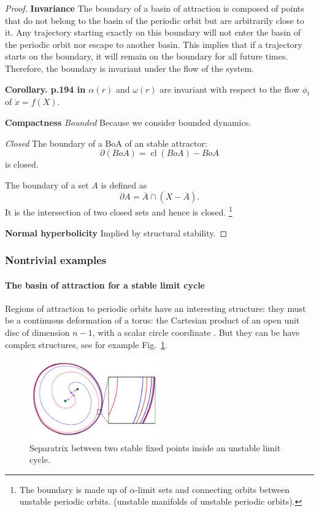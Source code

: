 \documentclass{article}
\theoremstyle{definition} \newtheorem{definition}{Definition}
\theoremstyle{remark} \newtheorem{remark}{Remark}
\newcommand{\cl}{\operatorname{cl}}
\newcounter{ct}
\begin{document}
\begin{proof}
\textbf{Invariance}
The boundary of a basin of attraction is composed of points that do not belong to the basin of the periodic orbit but are arbitrarily close to it.
 Any trajectory starting exactly on this boundary will not enter the basin of the periodic orbit nor escape to another basin.
This implies that if a trajectory starts on the boundary, it will remain on the boundary for all future times. Therefore, the boundary is invariant under the flow of the system.


\textbf{Corollary. p.194 in \citep{perko2013differential}} \( \alpha(r) \) and \( \omega(r) \) are invariant with respect to the flow \( \phi_t \) of \(\dot x = f(X)\). %

\textbf{Compactness}
\textit{Bounded} Because we consider bounded dynamics.

\textit{Closed} 
The boundary of a BoA of an stable attractor:
\[\partial(BoA) = \cl(BoA) -  BoA\]
is closed.

The boundary of a set \( A \) is defined as 
\[
\partial A = \overline{A} \cap (X - \overline{A}).
\]
It is the intersection of two closed sets and hence is closed.
\footnote{
The boundary is made up of 
$\alpha$-limit sets 
and
connecting orbits between unstable periodic orbits.
(unstable manifolds of unstable periodic orbits).
}


\textbf{Normal hyperbolicity}
Implied by structural stability.

\end{proof}

\subsubsection{Nontrivial examples}

\paragraph{The basin of attraction for a stable limit cycle}%
Regions of attraction to periodic orbits have an interesting structure: they must be a continuous deformation of a torus: the Cartesian product of an open unit disc of dimension $n-1$, with a scalar circle coordinate \citep{wilson1967structure}.
But they can be have complex structures, see for example Fig.~\ref{fig:unstab_lc_3fps}.

\setlength\belowcaptionskip{-5ex}
\begin{figure}
  \centering
  \includegraphics[width=0.5\textwidth]{unstab_lc_3fps}
  \caption{Separatrix between two stable fixed points inside an unstable limit cycle.
  }\label{fig:unstab_lc_3fps}
\end{figure}
\end{document}

